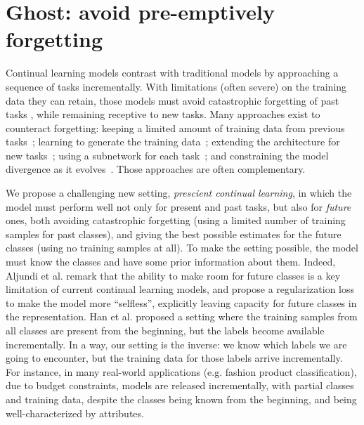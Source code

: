 




\section{Ghost: avoid pre-emptively forgetting}
\label{sec:ghost}

Continual learning models contrast with traditional models by approaching a sequence of tasks
incrementally. With limitations (often severe) on the training data they can retain, those models
must avoid catastrophic forgetting of past tasks \cite{robins1995catastrophicforgetting,
    french1999catastrophicforgetting}, while remaining receptive to new tasks. Many approaches exist to
counteract forgetting: keeping a limited amount of training data from previous
tasks~\cite{rebuffi2017icarl,castro2018end_to_end_inc_learn}; learning to generate the training
data~\cite{kemker2018fearnet,shin2017deep_generative_replay}; extending the architecture for new
tasks~\cite{yoon2018dynamically_expandable_networks,li2019learning_to_grow}; using a subnetwork for
each task~\cite{fernando2017path_net,golkar2019neural_pruning, hung2019cpg}; and constraining the
model divergence as it
evolves~\cite{kirkpatrick2017ewc,lopezpaz2017gem,aljundi2018MemoryAwareSynapses,li2018lwf,rebuffi2017icarl,castro2018end_to_end_inc_learn,
    douillard2020podnet}. Those approaches are often complementary.

We propose a challenging new setting, \textit{prescient continual learning}, in which the model must
perform well not only for present and past tasks, but also for \textit{future} ones, both avoiding
catastrophic forgetting (using a limited number of training samples for past classes), and giving
the best possible estimates for the future classes (using no training samples at all). To make the
setting possible, the model must know the classes and have some prior information about them.
Indeed, Aljundi et al. \cite{aljundi2019selfless} remark that the ability to make room for future
classes is a key limitation of current continual learning models, and propose a regularization loss
to make the model more “selfless”, explicitly leaving capacity for future classes in the
representation. Han et al. \cite{hanrebuffi2020autodiscovering} proposed a setting where the
training samples from all classes are present from the beginning, but the labels become available
incrementally. In a way, our setting is the inverse: we know which labels we are going to encounter,
but the training data for those labels arrive incrementally. For instance, in many real-world
applications (e.g. fashion product classification), due to budget constraints, models are released
incrementally, with partial classes and training data, despite the classes being known from the
beginning, and being well-characterized by attributes.

